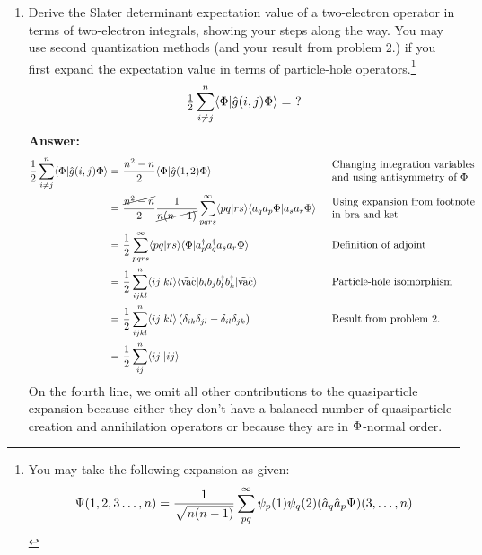 \documentclass[11pt]{article}
\numberwithin{equation}{section}
\begin{document}
\begin{enumerate}
\item
  Derive the Slater determinant expectation value of a two-electron operator in terms of two-electron integrals, showing your steps along the way.
  You may use second quantization methods (and your result from problem 2.) if you first expand the expectation value in terms of particle-hole operators.\footnote{
  You may take the following expansion as given:
  \begin{align*}
    \Psi (1,2,3\ldots,n)
  =
    \frac {1}{\sqrt{n(n-1)}}
    \sum_{pq}^\infty
    \psi _p(1)
    \psi _q(2)
    (\hat{a}_q\hat{a}_p\Psi )(3,\ldots,n)
  \end{align*}
  }
  \begin{align*}
    \tfrac{1}{2}
    \sum_{i\neq j}^n
    \langle\Phi |\hat{g}(i,j)\Phi \rangle
  =
    \,\,?
  \end{align*}
  \textbf{Answer:}
  \begin{align*}
    \frac {1}{2}
    \sum_{i\neq j}^n
    \langle\Phi |\hat{g}(i,j)\Phi \rangle
  =&\
    \frac {n^2 - n}{2}
    \langle\Phi |\hat{g}(1,2)\Phi \rangle
  &&
    \begin{array}{l}
      \text{Changing integration variables}\\
      \text{and using antisymmetry of $\Phi $}
    \end{array}
  \\=&\
    \frac {\cancel{n^2 - n}}{2}
    \frac {1}{\cancel{n(n-1)}}
    \sum_{pqrs}^\infty
    \langle pq|rs\rangle
    \langle a_qa_p\Phi |a_sa_r\Phi \rangle
  &&
    \begin{array}{l}
      \text{Using expansion from footnote}\\
      \text{in bra and ket}
    \end{array}
  \\=&\
    \frac {1}{2}
    \sum_{pqrs}^\infty
    \langle pq|rs\rangle
    \langle\Phi |a_p^\dagger a_q^\dagger a_sa_r\Phi \rangle
  &&
    \begin{array}{l}
      \text{Definition of adjoint}
    \end{array}
  \\=&\
    \frac {1}{2}
    \sum_{ijkl}^n
    \langle ij|kl\rangle
    \langle\widetilde{\mathrm{vac}}|b_ib_jb_l^\dagger b_k^\dagger|\widetilde{\mathrm{vac}}\rangle
  &&
    \begin{array}{l}
      \text{Particle-hole isomorphism}
    \end{array}
  \\=&\
    \frac {1}{2}
    \sum_{ijkl}^n
    \langle ij|kl\rangle
    \left(
      \delta _{ik}\delta _{jl}
    -
      \delta _{il}\delta _{jk}
    \right)
  &&
    \begin{array}{l}
      \text{Result from problem 2.}
    \end{array}
  \\=&\
    \frac {1}{2}
    \sum_{ij}^n
    \langle ij||ij\rangle
  \end{align*}
  On the fourth line, we omit all other contributions to the quasiparticle expansion because either they don't have a balanced number of quasiparticle creation and annihilation operators or because they are in $\Phi $-normal order.
\end{enumerate}
\end{document}
